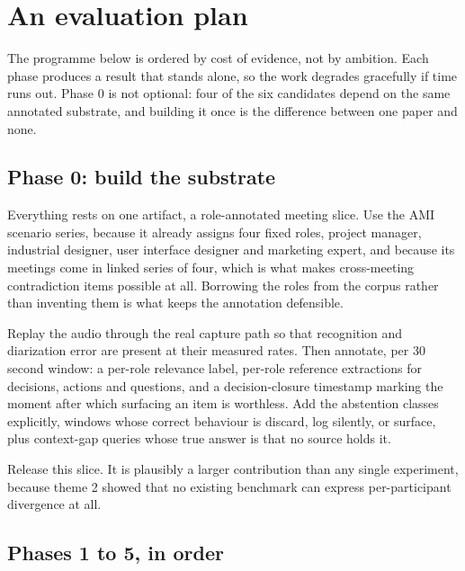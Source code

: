 \section{An evaluation plan}

The programme below is ordered by cost of evidence, not by ambition. Each
phase produces a result that stands alone, so the work degrades gracefully if
time runs out. Phase 0 is not optional: four of the six candidates depend on
the same annotated substrate, and building it once is the difference between
one paper and none.

\subsection{Phase 0: build the substrate}

Everything rests on one artifact, a role-annotated meeting slice. Use the AMI
scenario series, because it already assigns four fixed roles, project manager,
industrial designer, user interface designer and marketing expert, and because
its meetings come in linked series of four, which is what makes cross-meeting
contradiction items possible at all. Borrowing the roles from the corpus rather
than inventing them is what keeps the annotation defensible.

Replay the audio through the real capture path so that recognition and
diarization error are present at their measured rates. Then annotate, per 30
second window: a per-role relevance label, per-role reference extractions for
decisions, actions and questions, and a decision-closure timestamp marking the
moment after which surfacing an item is worthless. Add the abstention classes
explicitly, windows whose correct behaviour is discard, log silently, or
surface, plus context-gap queries whose true answer is that no source holds it.

Release this slice. It is plausibly a larger contribution than any single
experiment, because theme 2 showed that no existing benchmark can express
per-participant divergence at all.

\subsection{Phases 1 to 5, in order}


